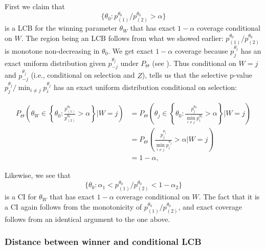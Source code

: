 \documentclass{article}
\begin{document}
\begin{appendix}
First we claim that 
\begin{equation*}
    \{\theta_0 : p^{\theta_0}_{(1)}/p^{\theta_0}_{(2)} > \alpha\}
\end{equation*}
is a LCB for the winning parameter $\theta_W$ that has exact $1-\alpha$ coverage conditional on $W$. The region being an LCB follows from what we showed earlier: $p^{\theta_0}_{(1)}/p^{\theta_0}_{(2)}$ is monotone non-decreasing in $\theta_0$. We get exact $1-\alpha$ coverage because $p^{\theta_j}_j$ has an exact uniform distribution given $p^{\theta_j}_{-j}$ under $P_{\Theta}$ (see ). Thus conditional on $W = j$ and $p^{\theta_j}_{-j}$ (i.e., conditional on selection and $Z$),  tells us that the selective p-value $p^{\theta_j}_{j}/ \min_{i \neq j} p^{\theta_j}_i$ has an exact uniform distribution conditional on selection:
    
\begin{align*}
        P_{\Theta}\left( \theta_W \in \left\{ \theta_0 : \frac{p^{\theta_0}_{(1)}}{p^{\theta_0}_{(2)}} > \alpha \right\} | W=j \right) &= P_{\Theta}\left( \theta_j \in \left\{ \theta_0 : \frac{p^{\theta_0}_{j}}{ \min_{i \neq j} p^{\theta_0}_i} > \alpha \right\} | W=j \right)\\
                                     &= P_{\Theta}\left(  \frac{p^{\theta_j}_{j}}{ \min_{i \neq j} p^{\theta_j}_i} > \alpha  | W=j \right)\\
                                    &= 1-\alpha,
\end{align*} 

Likewise, we see that 
\begin{equation*}
    \{\theta_0 : \alpha_1 < p^{\theta_0}_{(1)}/p^{\theta_0}_{(2)} < 1-\alpha_2 \}
\end{equation*}
is a CI for $\theta_W$ that has exact $1-\alpha$ coverage conditional on $W$. The fact that it is a CI again follows from the monotonicity of $p^{\theta_0}_{(1)}/p^{\theta_0}_{(2)}$, and exact coverage follows from an identical argument to the one above.  

\subsubsection{Distance between winner and conditional LCB }
\label{sec:gap_appdx}


\end{appendix}
\end{document}

